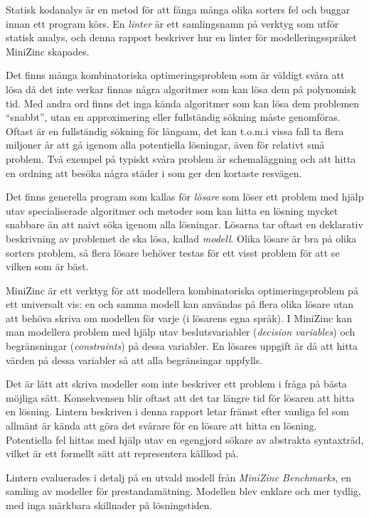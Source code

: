 \documentclass[a4paper,12pt]{article}
\begin{document}
\begin{sammanfattning}
Statisk kodanalys är en metod för att fånga många olika sorters fel och buggar innan
ett program körs. En \emph{linter} är ett samlingsnamn på verktyg som utför
statisk analys, och denna rapport beskriver hur en linter för modelleringsspråket MiniZinc
skapades.

Det finns många kombinatoriska optimeringsproblem som är väldigt svåra att lösa då det inte verkar finnas
några algoritmer
som kan lösa dem på polynomisk tid. Med andra ord finns det inga kända algoritmer som kan lösa
dem problemen ``snabbt'', utan en approximering eller fullständig sökning måste genomföras.
Oftast är en fullständig sökning för långsam, det kan t.o.m.\@ i vissa fall ta flera miljoner år att gå
igenom alla potentiella lösningar, även för relativt små problem.
Två exempel på typiskt svåra problem är schemaläggning och att hitta en ordning att besöka några städer
i som ger den kortaste resvägen.

Det finns generella program som kallas för \emph{lösare} som löser ett problem med hjälp
utav specialiserade algoritmer och metoder som kan hitta en lösning mycket snabbare än att
naivt söka igenom alla lösningar. Lösarna tar oftast en deklarativ beskrivning
av problemet de ska lösa, kallad \emph{modell}. Olika lösare är bra på olika sorters problem, så
flera lösare behöver testas för ett visst problem för att se vilken som är bäst.

MiniZinc är ett verktyg för att modellera kombinatoriska optimeringsproblem på ett universalt vis: en
och samma modell kan användas på flera olika lösare utan att behöva skriva om modellen för
varje (i lösarens egna språk). I MiniZinc kan man modellera problem med hjälp utav beslutsvariabler (\emph{decision
variables}) och begränsningar (\emph{constraints}) på dessa variabler. En lösares uppgift är då att
hitta värden på dessa variabler så att alla begränsingar uppfylls.

Det är lätt att skriva modeller som inte beskriver ett problem i fråga på bästa möjliga
sätt. Konsekvensen blir oftast att det tar längre tid för lösaren att hitta en lösning.
Lintern beskriven i denna rapport letar främst efter vanliga fel som allmänt är kända att
göra det svårare för en lösare att hitta en lösning. Potentiella fel hittas med hjälp utav
en egengjord sökare av abstrakta syntaxträd, vilket är ett formellt sätt att representera källkod på.

Lintern evaluerades i detalj på en utvald modell från \emph{MiniZinc Benchmarks}, en samling av
modeller för prestandamätning. Modellen blev enklare och mer tydlig, med inga märkbara skillnader på lösningstiden.
\end{sammanfattning}
\end{document}
